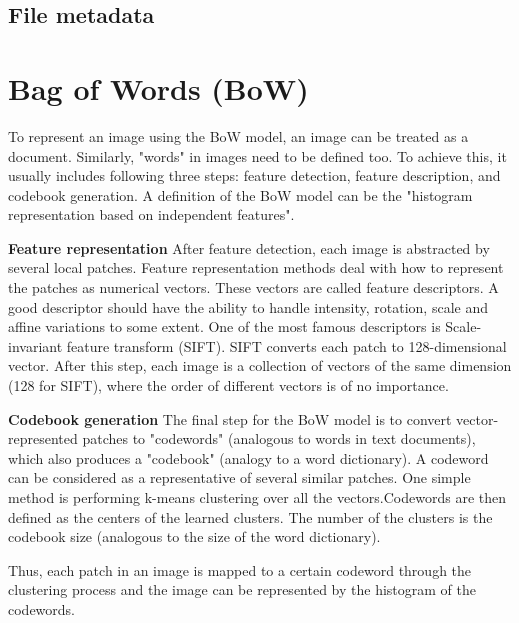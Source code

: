 \documentclass[12pt]{article}
\numberwithin{equation}{section}
\numberwithin{table}{section}
\numberwithin{figure}{section}
\begin{document}
\subsection{File metadata}




\cite{Haug2015}







\section{Bag of Words (BoW)} \label{bow}

To represent an image using the BoW model, an image can be treated as a document. Similarly, "words" in images need to be defined too. To achieve this, it usually includes following three steps: feature detection, feature description, and codebook generation. A definition of the BoW model can be the "histogram representation based on independent features".

\textbf{Feature representation}
After feature detection, each image is abstracted by several local patches. Feature representation methods deal with how to represent the patches as numerical vectors. These vectors are called feature descriptors. A good descriptor should have the ability to handle intensity, rotation, scale and affine variations to some extent. One of the most famous descriptors is Scale-invariant feature transform (SIFT). SIFT converts each patch to 128-dimensional vector. After this step, each image is a collection of vectors of the same dimension (128 for SIFT), where the order of different vectors is of no importance.

\textbf{Codebook generation}
The final step for the BoW model is to convert vector-represented patches to "codewords" (analogous to words in text documents), which also produces a "codebook" (analogy to a word dictionary). A codeword can be considered as a representative of several similar patches. One simple method is performing k-means clustering over all the vectors.Codewords are then defined as the centers of the learned clusters. The number of the clusters is the codebook size (analogous to the size of the word dictionary).

Thus, each patch in an image is mapped to a certain codeword through the clustering process and the image can be represented by the histogram of the codewords.
\end{document}
